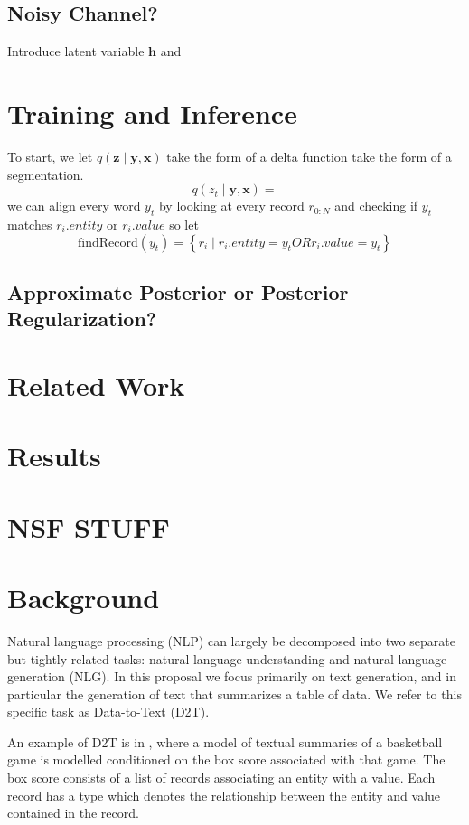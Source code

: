 \documentclass{article}
\newcommand\set[1]{\left\{#1\right\}}
\newcommand{\bh}{\mathbf{h}}
\newcommand{\bx}{\mathbf{x}}
\newcommand{\by}{\mathbf{y}}
\newcommand{\bz}{\mathbf{z}}
\begin{document}
\subsection{Noisy Channel?}
Introduce latent variable $\bh$ and 

\section{Training and Inference}
To start, we let $q(\bz\mid\by,\bx)$ take the form of a
delta function take the form of a segmentation.
$$q(z_t\mid\by,\bx)=$$
we can align every word $y_t$ by looking at every record $r_{0:N}$ and checking if $y_t$ matches $r_i.entity$ or $r_i.value$
so let
$$\textrm{findRecord}(y_t) = \set{ r_i \mid r_i.entity = y_t OR r_i.value = y_t }$$
\subsection{Approximate Posterior or Posterior Regularization?}

\section{Related Work}

\section{Results}

\section{NSF STUFF}
\section{Background}
Natural language processing (NLP) can largely be decomposed into two separate but
tightly related tasks: natural language understanding and natural language generation (NLG).
In this proposal we focus primarily on text generation, and in particular
the generation of text that summarizes a table of data.
We refer to this specific task as Data-to-Text (D2T).

An example of D2T is in \citet{wiseman2017d2t},
where a model of textual summaries of a basketball game is modelled conditioned on
the box score associated with that game.
The box score consists of a list of records associating an entity with a value.
Each record has a type which denotes the relationship between the entity and value
contained in the record.
\end{document}
